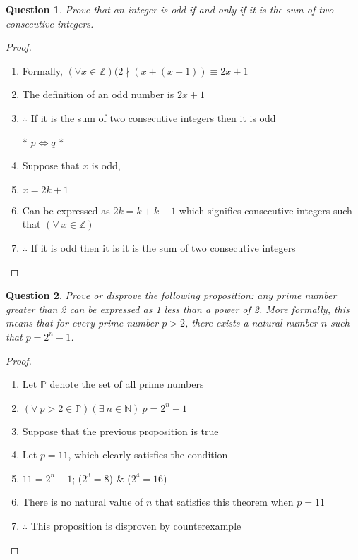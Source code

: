 \documentclass[11pt,oneside]{article}
\newtheorem{question}{Question}
\begin{document}
\newpage

\begin{question}
    Prove that an integer is odd if and only if it is the sum of two consecutive integers.
\end{question}

\begin{proof}
    \begin{enumerate}
        \item Formally, $(\forall x \in \mathbb{Z})(2 \nmid (x + (x+1)) \equiv 2x + 1$
        \item The definition of an odd number is $2x + 1$
        \item $\therefore$ If it is the sum of two consecutive integers then it is odd \\
            \centerline{* \boldmath$p \Leftrightarrow q$ *}
        \item Suppose that $x$ is odd,
        \item $x = 2k + 1$
        \item Can be expressed as $2k = k + k + 1$ which signifies consecutive integers such that $(\forall \ x \in \mathbb{Z})$
        \item $\therefore$ If it is odd then it is it is the sum of two consecutive integers
    \end{enumerate}
\end{proof}

\bigskip

\begin{question}
    Prove or disprove the following proposition: any prime number greater than 2 can be expressed as 1 less than a power of 2. More formally, this means that for every prime number $p > 2$, there exists a natural number $n$ such that $p = 2^n - 1$.
\end{question}

\begin{proof}
    \begin{enumerate}
        \item Let $\mathbb{P}$ denote the set of all prime numbers
        \item $(\forall \ p > 2 \in \mathbb{P})(\exists \ n \in \mathbb{N})\ p = 2^n - 1$
        \item Suppose that the previous proposition is true
        \item Let $p = 11$, which clearly satisfies the condition
        \item $11 = 2^n - 1$; ($2^3 = 8$) \& ($2^4 = 16$)
        \item There is no natural value of $n$ that satisfies this theorem when $p=11$
        \item  $\therefore$ This proposition is disproven by counterexample
    \end{enumerate}
\end{proof}
\end{document}
